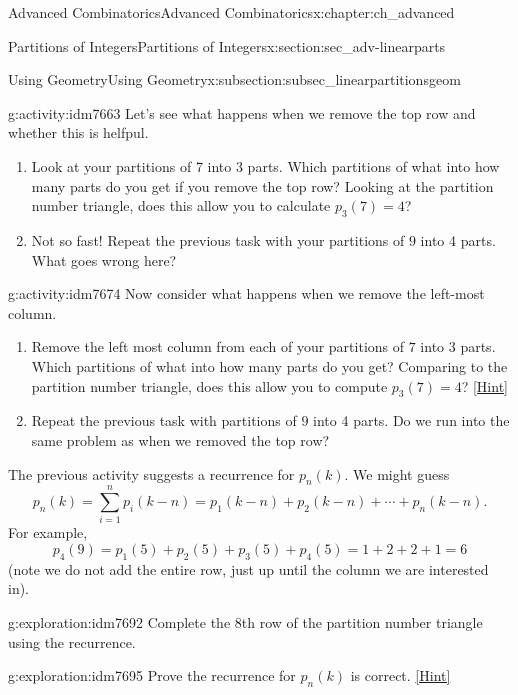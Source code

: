 \documentclass[oneside,10pt,]{book}
\numberwithin{equation}{chapter}
\begin{document}
\begin{chapterptx}{Advanced Combinatorics}{}{Advanced Combinatorics}{}{}{x:chapter:ch_advanced}
\begin{sectionptx}{Partitions of Integers}{}{Partitions of Integers}{}{}{x:section:sec_adv-linearparts}
\begin{subsectionptx}{Using Geometry}{}{Using Geometry}{}{}{x:subsection:subsec_linearpartitionsgeom}
\begin{activity}{}{g:activity:idm7663}
Let's see what happens when we remove the top row and whether this is helfpul.%
\begin{enumerate}[font=\bfseries,label=(\alph*),ref=\alph*]
\item{}Look at your partitions of 7 into 3 parts.  Which partitions of what into how many parts do you get if you remove the top row?  Looking at the partition number triangle, does this allow you to calculate \(p_3(7) = 4\)?%
\item{}Not so fast!  Repeat the previous task with your partitions of \(9\) into 4 parts.  What goes wrong here?%
\end{enumerate}
\end{activity}
\begin{activity}{}{g:activity:idm7674}%
Now consider what happens when we remove the left-most column.%
\begin{enumerate}[font=\bfseries,label=(\alph*),ref=\alph*]
\item{}Remove the left most column from each of your partitions of \(7\) into 3 parts.  Which partitions of what into how many parts do you get?  Comparing to the partition number triangle, does this allow you to compute \(p_3(7) = 4\)?%
\space\hspace*{0pt}\hfill{\tiny\hyperlink{g:hint:idm7682-back}{[Hint]}}\item{}Repeat the previous task with partitions of \(9\) into 4 parts.  Do we run into the same problem as when we removed the top row?%
\end{enumerate}
\end{activity}
The previous activity suggests a recurrence for \(p_n(k)\).  We might guess%
\begin{equation*}
p_n(k) = \sum_{i=1}^n p_i(k-n) = p_1(k-n) + p_2(k-n) + \cdots + p_n(k-n)\text{.}
\end{equation*}
For example,%
\begin{equation*}
p_4(9) = p_1(5) + p_2(5) + p_3(5)+ p_4(5) = 1+2+2+1 = 6
\end{equation*}
(note we do not add the entire row, just up until the column we are interested in).%
\begin{exploration}{}{g:exploration:idm7692}%
Complete the 8th row of the partition number triangle using the recurrence.%
\end{exploration}
\begin{exploration}{}{g:exploration:idm7695}%
Prove the recurrence for \(p_n(k)\) is correct.%
\space\hspace*{0pt}\hfill{\tiny\hyperlink{g:hint:idm7699-back}{[Hint]}}\end{exploration}

\end{subsectionptx}
\end{sectionptx}
\end{chapterptx}
\end{document}
